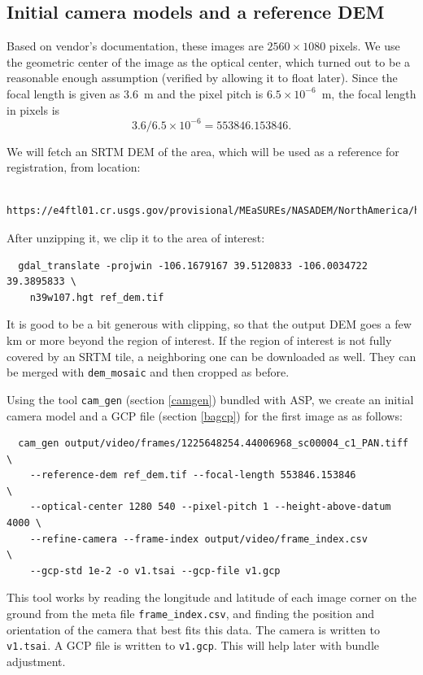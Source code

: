 \subsection{Initial camera models and a reference DEM}

Based on vendor's documentation, these images are $2560 \times 1080$
pixels.  We use the geometric center of the image as the optical center,
which turned out to be a reasonable enough assumption (verified by
allowing it to float later). Since the focal length is given as 3.6~m and
the pixel pitch is $6.5 \times 10^{-6}$~m, the focal length in pixels is
$$
  3.6/6.5 \times 10^{-6} = 553846.153846. 
$$

We will fetch an SRTM DEM of the area, which will be used as a reference
for registration, from location: 

\begin{verbatim}
  https://e4ftl01.cr.usgs.gov/provisional/MEaSUREs/NASADEM/NorthAmerica/hgt_merge/n39w107.hgt.zip
\end{verbatim}

After unzipping it, we clip it to the area of interest:

\begin{verbatim}
  gdal_translate -projwin -106.1679167 39.5120833 -106.0034722 39.3895833 \
    n39w107.hgt ref_dem.tif
\end{verbatim}

It is good to be a bit generous with clipping, so that the output DEM
goes a few km or more beyond the region of interest. If the region of
interest is not fully covered by an SRTM tile, a neighboring one can be
downloaded as well.  They can be merged with \texttt{dem\_mosaic} and
then cropped as before.

Using the tool \texttt{cam\_gen} (section \ref{camgen}) 
bundled with ASP, we create an initial camera model and a GCP file (section \ref{bagcp})
for the first image as as follows:

\begin{verbatim}
  cam_gen output/video/frames/1225648254.44006968_sc00004_c1_PAN.tiff   \
    --reference-dem ref_dem.tif --focal-length 553846.153846            \
    --optical-center 1280 540 --pixel-pitch 1 --height-above-datum 4000 \
    --refine-camera --frame-index output/video/frame_index.csv          \
    --gcp-std 1e-2 -o v1.tsai --gcp-file v1.gcp
\end{verbatim}

This tool works by reading the longitude and latitude of each image corner on the ground 
from the meta file \texttt{frame\_index.csv}, and finding the position and orientation
of the camera that best fits this data. The camera is written to \texttt{v1.tsai}. 
A GCP file is written to \texttt{v1.gcp}. This will help later with bundle adjustment.

